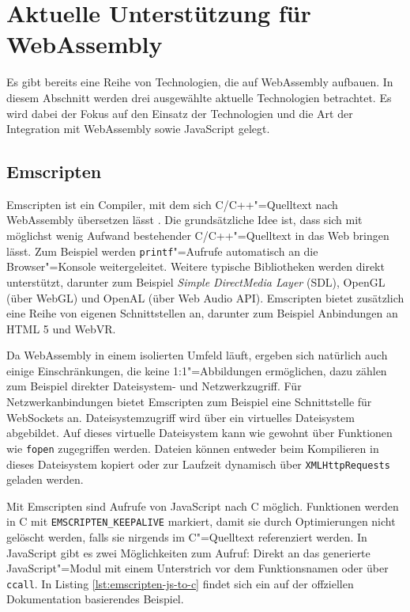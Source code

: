 \pagebreak
\section{Aktuelle Unterstützung für WebAssembly}
Es gibt bereits eine Reihe von Technologien, die auf WebAssembly aufbauen. In diesem Abschnitt werden drei ausgewählte aktuelle Technologien betrachtet. Es wird dabei der Fokus auf den Einsatz der Technologien und die Art der Integration mit WebAssembly sowie JavaScript gelegt.

\subsection{Emscripten}

Emscripten ist ein Compiler, mit dem sich C/C++"=Quelltext nach WebAssembly übersetzen lässt \cite{Emscripten}. Die grundsätzliche Idee ist, dass sich mit möglichst wenig Aufwand bestehender C/C++"=Quelltext in das Web bringen lässt. Zum Beispiel werden \lstinline{printf}"=Aufrufe automatisch an die Browser"=Konsole weitergeleitet. Weitere typische Bibliotheken werden direkt unterstützt, darunter zum Beispiel \emph{Simple DirectMedia Layer} (SDL), OpenGL (über WebGL) und OpenAL (über Web Audio API). Emscripten bietet zusätzlich eine Reihe von eigenen Schnittstellen an, darunter zum Beispiel Anbindungen an HTML 5 und WebVR.

Da WebAssembly in einem isolierten Umfeld läuft, ergeben sich natürlich auch einige Einschränkungen, die keine 1:1"=Abbildungen ermöglichen, dazu zählen zum Beispiel direkter Dateisystem- und Netzwerkzugriff. Für Netzwerkanbindungen bietet Emscripten zum Beispiel eine Schnittstelle für WebSockets an. Dateisystemzugriff wird über ein virtuelles Dateisystem abgebildet. Auf dieses virtuelle Dateisystem kann wie gewohnt über Funktionen wie \lstinline{fopen} zugegriffen werden. Dateien können entweder beim Kompilieren in dieses Dateisystem kopiert oder zur Laufzeit dynamisch über \lstinline{XMLHttpRequests} geladen werden.

Mit Emscripten sind Aufrufe von JavaScript nach C möglich. Funktionen werden in C mit \lstinline{EMSCRIPTEN_KEEPALIVE} markiert, damit sie durch Optimierungen nicht gelöscht werden, falls sie nirgends im C"=Quelltext referenziert werden. In JavaScript gibt es zwei Möglichkeiten zum Aufruf: Direkt an das generierte JavaScript"=Modul mit einem Unterstrich vor dem Funktionsnamen oder über \lstinline{ccall}. In Listing \ref{lst:emscripten-js-to-c} findet sich ein auf der offziellen Dokumentation basierendes Beispiel.

